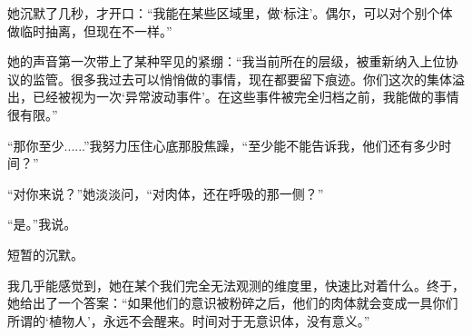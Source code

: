 她沉默了几秒，才开口：“我能在某些区域里，做‘标注’。偶尔，可以对个别个体做临时抽离，但现在不一样。”

她的声音第一次带上了某种罕见的紧绷：“我当前所在的层级，被重新纳入上位协议的监管。很多我过去可以悄悄做的事情，现在都要留下痕迹。你们这次的集体溢出，已经被视为一次‘异常波动事件’。在这些事件被完全归档之前，我能做的事情很有限。”

“那你至少......”我努力压住心底那股焦躁，“至少能不能告诉我，他们还有多少时间？”

“对你来说？”她淡淡问，“对肉体，还在呼吸的那一侧？”

“是。”我说。

短暂的沉默。

我几乎能感觉到，她在某个我们完全无法观测的维度里，快速比对着什么。终于，她给出了一个答案：“如果他们的意识被粉碎之后，他们的肉体就会变成一具你们所谓的‘植物人’，永远不会醒来。时间对于无意识体，没有意义。”
